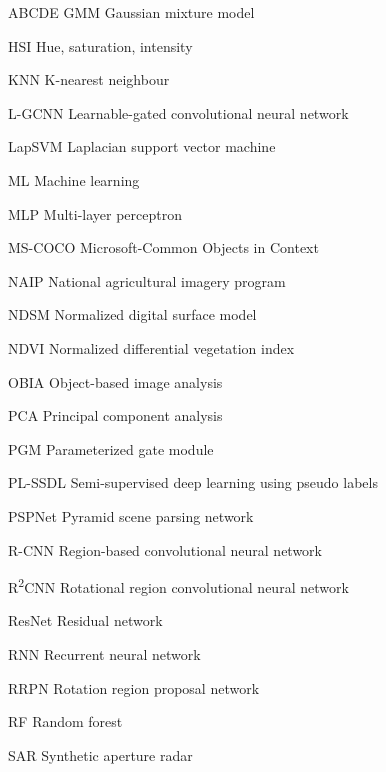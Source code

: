 \begin{seznamzkratek}{ABCDE}
	      {GMM}
	      {Gaussian mixture model}

	      {HSI}
	      {Hue, saturation, intensity}

	      {KNN}
	      {K-nearest neighbour}

	      {L-GCNN}
	      {Learnable-gated convolutional neural network}

	      {LapSVM}
	      {Laplacian support vector machine}

	      {ML}
	      {Machine learning}

	      {MLP}
	      {Multi-layer perceptron}

	      {MS-COCO}
	      {Microsoft-Common Objects in Context}

	      {NAIP}
	      {National agricultural imagery program}

	      {NDSM}
	      {Normalized digital surface model}

	      {NDVI}
	      {Normalized differential vegetation index}

	      {OBIA}
	      {Object-based image analysis}

	      {PCA}
	      {Principal component analysis}

	      {PGM}
	      {Parameterized gate module}

	      {PL-SSDL}
	      {Semi-supervised deep learning using pseudo labels}

	      {PSPNet}
	      {Pyramid scene parsing network}

	      {R-CNN}
	      {Region-based convolutional neural network}

	      {R\textsuperscript{2}CNN}
	      {Rotational region convolutional neural network}

	      {ResNet}
	      {Residual network}

	      {RNN}
	      {Recurrent neural network}

	      {RRPN}
	      {Rotation region proposal network}

	      {RF}
	      {Random forest}

	      {SAR}
	      {Synthetic aperture radar}


\end{seznamzkratek}
